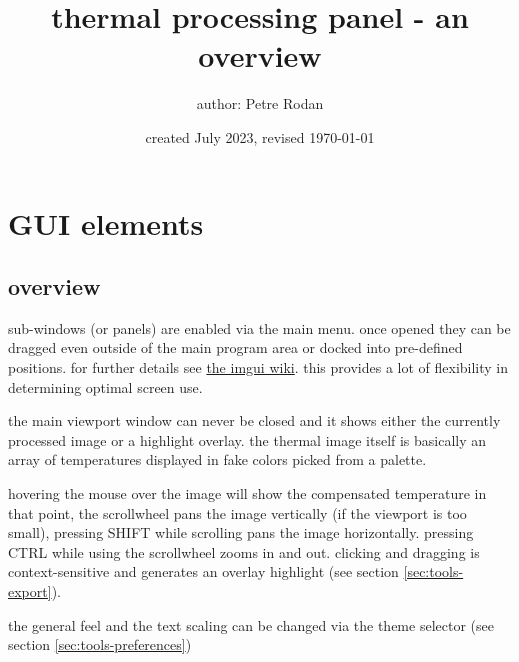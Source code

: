 \documentclass[12pt,twoside,a4paper,titlepage]{report}
\begin{document}
 


\fancyhf{}

\fancyhead{} %
\fancyhead[LO]{\rightmark }
\fancyhead[RE]{\leftmark }
\fancyhead[LE,RO]{\thepage }


\title{\textbf{thermal processing panel} - an overview}
\author{author: Petre Rodan}
\date{created July 2023, revised \today}
\maketitle

\tableofcontents


\chapter{GUI elements}

\section{overview}

sub-windows (or panels) are enabled via the main menu. once opened they can be dragged even outside of the main program area or docked into pre-defined positions. for further details see \href{https://github.com/ocornut/imgui/wiki/Docking}{the imgui wiki}. this provides a lot of flexibility in determining optimal screen use.

the main viewport window can never be closed and it shows either the currently processed image or a highlight overlay. the thermal image itself is basically an array of temperatures displayed in fake colors picked from a palette.

hovering the mouse over the image will show the compensated temperature in that point, the scrollwheel pans the image vertically (if the viewport is too small),  pressing SHIFT while scrolling pans the image horizontally. pressing CTRL while using the scrollwheel zooms in and out. clicking and dragging is context-sensitive and generates an overlay highlight  (see section \ref{sec:tools-export}).

the general feel and the text scaling can be changed via the theme selector (see section \ref{sec:tools-preferences})
\end{document}
